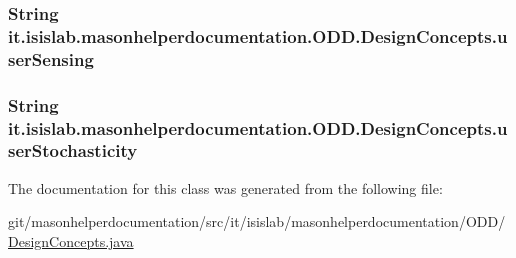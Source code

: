 \hypertarget{classit_1_1isislab_1_1masonhelperdocumentation_1_1_o_d_d_1_1_design_concepts_a79cb2b2a618b459fff8bb1fc129ce3cf}{
\subsubsection[{user\-Sensing}]{\setlength{\rightskip}{0pt plus 5cm}String it.\-isislab.\-masonhelperdocumentation.\-O\-D\-D.\-Design\-Concepts.\-user\-Sensing\hspace{0.3cm}{\ttfamily [package]}}}\label{classit_1_1isislab_1_1masonhelperdocumentation_1_1_o_d_d_1_1_design_concepts_a79cb2b2a618b459fff8bb1fc129ce3cf}
\hypertarget{classit_1_1isislab_1_1masonhelperdocumentation_1_1_o_d_d_1_1_design_concepts_a927ab93d0fab6d30ff07bbd099a84163}{
\subsubsection[{user\-Stochasticity}]{\setlength{\rightskip}{0pt plus 5cm}String it.\-isislab.\-masonhelperdocumentation.\-O\-D\-D.\-Design\-Concepts.\-user\-Stochasticity\hspace{0.3cm}{\ttfamily [package]}}}\label{classit_1_1isislab_1_1masonhelperdocumentation_1_1_o_d_d_1_1_design_concepts_a927ab93d0fab6d30ff07bbd099a84163}


The documentation for this class was generated from the following file\-:\begin{DoxyCompactItemize}
\item 
git/masonhelperdocumentation/src/it/isislab/masonhelperdocumentation/\-O\-D\-D/\hyperlink{_design_concepts_8java}{Design\-Concepts.\-java}\end{DoxyCompactItemize}
